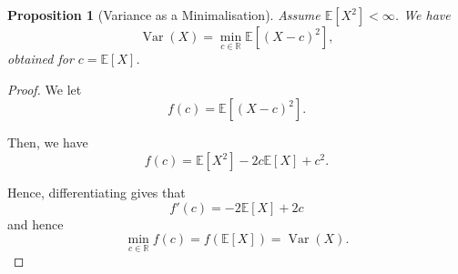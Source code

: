 \documentclass[11pt]{article}
\numberwithin{equation}{section}
\newtheorem{proposition}[theorem]{Proposition}
\theoremstyle{definition}
\theoremstyle{remark}
\newcommand{\pqty}[1]{\left(#1\right)}
\newcommand{\bqty}[1]{\left[#1\right]}
\newcommand{\RR}{\mathbb R}
\newcommand{\Expt}{\mathbb E}
\DeclareMathOperator{\Var}{Var}
\begin{document}
\begin{proposition}[Variance as a Minimalisation]\label{probability-proposition-012}
    \label{probability-prop:variance-minimalisation}%
Assume \(\Expt[X^2]<\infty\).
    We have
    \[
        \Var\pqty{X} = \min_{c \in \RR} \Expt\bqty{\pqty{X - c}^2},
    \]
    obtained for \(c = \Expt\bqty{X}\).
\end{proposition}

\begin{proof}\label{probability-proof-022}
    We let
    \[
        f\pqty{c} = \Expt\bqty{\pqty{X - c}^2}.
    \]

    Then, we have
    \[
        f\pqty{c} = \Expt\bqty{X^2} - 2c \Expt\bqty{X} + c^2.
    \]

    Hence, differentiating gives that
    \[
        f'\pqty{c} = -2 \Expt\bqty{X} + 2c
    \]
    and hence
    \[
        \min_{c \in \RR} f\pqty{c} = f\pqty{\Expt\bqty{X}} = \Var\pqty{X}.
    \]
\end{proof}
\end{document}
